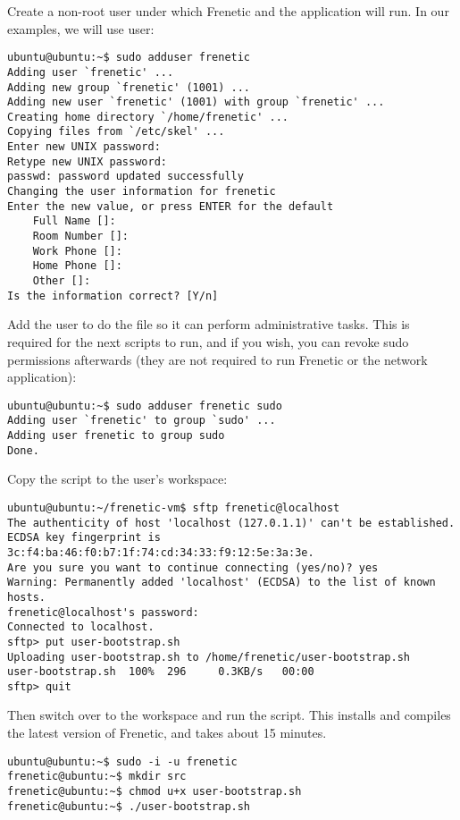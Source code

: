 Create a non-root user under which Frenetic and the application will run.  In our examples, we will
use  user:

\begin{verbatim}
ubuntu@ubuntu:~$ sudo adduser frenetic
Adding user `frenetic' ...
Adding new group `frenetic' (1001) ...
Adding new user `frenetic' (1001) with group `frenetic' ...
Creating home directory `/home/frenetic' ...
Copying files from `/etc/skel' ...
Enter new UNIX password:
Retype new UNIX password:
passwd: password updated successfully
Changing the user information for frenetic
Enter the new value, or press ENTER for the default
	Full Name []:
	Room Number []:
	Work Phone []:
	Home Phone []:
	Other []:
Is the information correct? [Y/n]
\end{verbatim}

Add the  user to do the  file so it can perform administrative
tasks.  This is required for the next scripts to run, and if you wish, you can revoke sudo permissions
afterwards (they are not required to run Frenetic or the network application):

\begin{verbatim}
ubuntu@ubuntu:~$ sudo adduser frenetic sudo
Adding user `frenetic' to group `sudo' ...
Adding user frenetic to group sudo
Done.
\end{verbatim}

Copy the  script to the  user's workspace:

\begin{verbatim}
ubuntu@ubuntu:~/frenetic-vm$ sftp frenetic@localhost
The authenticity of host 'localhost (127.0.1.1)' can't be established.
ECDSA key fingerprint is 3c:f4:ba:46:f0:b7:1f:74:cd:34:33:f9:12:5e:3a:3e.
Are you sure you want to continue connecting (yes/no)? yes
Warning: Permanently added 'localhost' (ECDSA) to the list of known hosts.
frenetic@localhost's password:
Connected to localhost.
sftp> put user-bootstrap.sh
Uploading user-bootstrap.sh to /home/frenetic/user-bootstrap.sh
user-bootstrap.sh  100%  296     0.3KB/s   00:00
sftp> quit
\end{verbatim}

Then switch over to the  workspace and run the script.  This installs and 
compiles the latest version of Frenetic, and takes about 15 minutes.

\begin{verbatim}
ubuntu@ubuntu:~$ sudo -i -u frenetic
frenetic@ubuntu:~$ mkdir src
frenetic@ubuntu:~$ chmod u+x user-bootstrap.sh
frenetic@ubuntu:~$ ./user-bootstrap.sh
\end{verbatim}

